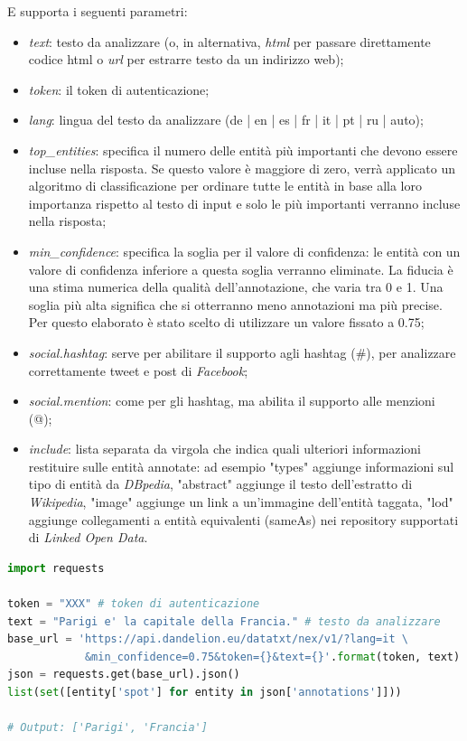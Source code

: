 \documentclass[a4paper,11pt]{article}
\begin{document}
E supporta i seguenti parametri:
\begin{itemize}
	\item \textit{text}: testo da analizzare (o, in alternativa, \textit{html} per passare direttamente codice html o \textit{url} per estrarre testo da un indirizzo web);
	\item \textit{token}: il token di autenticazione;
	\item \textit{lang}: lingua del testo da analizzare (de | en | es | fr | it | pt | ru | auto);
	\item \textit{top\_entities}: specifica il numero delle entità più importanti che devono essere incluse nella risposta. Se questo valore è maggiore di zero, verrà applicato un algoritmo di classificazione per ordinare tutte le entità in base alla loro importanza rispetto al testo di input e solo le più importanti verranno incluse nella risposta;
	\item \textit{min\_confidence}: specifica la soglia per il valore di confidenza: le entità con un valore di confidenza inferiore a questa soglia verranno eliminate. La fiducia è una stima numerica della qualità dell'annotazione, che varia tra 0 e 1. Una soglia più alta significa che si otterranno meno annotazioni ma più precise. Per questo elaborato è stato scelto di utilizzare un valore fissato a 0.75;
	\item \textit{social.hashtag}: serve per abilitare il supporto agli hashtag (\#), per analizzare correttamente tweet e post di \textit{Facebook};
	\item \textit{social.mention}: come per gli hashtag, ma abilita il supporto alle menzioni (@);
	\item \textit{include}: lista separata da virgola che indica quali ulteriori informazioni restituire sulle entità annotate: ad esempio "types" aggiunge informazioni sul tipo di entità da \textit{DBpedia}, "abstract" aggiunge il testo dell'estratto di \textit{Wikipedia}, "image" aggiunge un link a un'immagine dell'entità taggata, "lod" aggiunge collegamenti a entità equivalenti (sameAs) nei repository supportati di \textit{Linked Open Data}.\newline
\end{itemize}

\begin{lstlisting}[basicstyle=\small, language=python, frame=single, caption={Esempio di codice Python per l'estrazione di entità tramite le API di \textit{Dandelion}.},captionpos=b]
import requests

token = "XXX" # token di autenticazione
text = "Parigi e' la capitale della Francia." # testo da analizzare
base_url = 'https://api.dandelion.eu/datatxt/nex/v1/?lang=it \
            &min_confidence=0.75&token={}&text={}'.format(token, text)
json = requests.get(base_url).json()
list(set([entity['spot'] for entity in json['annotations']]))

# Output: ['Parigi', 'Francia']
\end{lstlisting}
\end{document}
